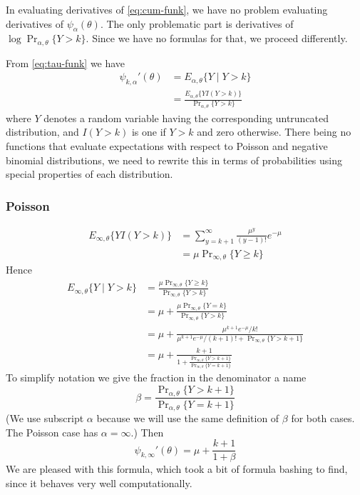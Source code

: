 \documentclass[11pt]{article}
\newcommand{\Prsub}[1]{\Pr\nolimits_{#1}}
\begin{document}
In evaluating derivatives of \eqref{eq:cum-funk}, we have no
problem evaluating derivatives of $\psi_\alpha(\theta)$.
The only problematic part is derivatives of
$\log \Prsub{\alpha, \theta}\{Y > k\}$.
Since we have no formulas for that, we proceed differently.

From \eqref{eq:tau-funk} we have
\begin{align*}
   \psi_{k, \alpha}'(\theta)
   & =
   E_{\alpha, \theta}\{ Y \mid Y > k \}
   \\
   & =
   \frac{E_{\alpha, \theta}\{ Y I(Y > k) \}}
   {\Prsub{\alpha, \theta}\{Y > k\}}
\end{align*}
where $Y$ denotes a random variable having the corresponding
untruncated distribution, and $I(Y > k)$ is one if $Y > k$ and zero otherwise.
There being no functions that evaluate expectations with respect
to Poisson and negative binomial distributions, we need to rewrite
this in terms of probabilities using special properties of each distribution.

\subsubsection{Poisson}

\begin{equation} \label{eq:trick-pois}
\begin{split}
   E_{\infty, \theta}\{ Y I(Y > k) \}
   & =
   \sum_{y = k + 1}^\infty \frac{\mu^y}{(y - 1) !} e^{- \mu}
   \\
   & =
   \mu \Prsub{\infty, \theta}\{Y \ge k\}
\end{split}
\end{equation}
Hence
\begin{align*}
   E_{\infty, \theta}\{ Y \mid Y > k \}
   & =
   \frac{\mu \Prsub{\infty, \theta}\{Y \ge k\}}
   {\Prsub{\infty, \theta}\{Y > k\}}
   \\
   & =
   \mu + \frac{\mu \Prsub{\infty, \theta}\{Y = k\}}
   {\Prsub{\infty, \theta}\{Y > k\}}
   \\
   & =
   \mu +
   \frac{\mu^{k + 1} e^{- \mu} / k !}
   {\mu^{k + 1} e^{- \mu} / (k + 1) ! + \Prsub{\infty, \theta}\{Y > k + 1 \}}
   \\
   & =
   \mu +
   \frac{k + 1}
   {1 + \frac{\Prsub{\infty, \theta}\{Y > k + 1 \}}
   {\Prsub{\infty, \theta}\{Y = k + 1 \}}}
\end{align*}
To simplify notation we give the fraction in the denominator a name
\begin{equation} \label{eq:beta}
   \beta = \frac{\Prsub{\alpha, \theta}\{Y > k + 1 \}}
   {\Prsub{\alpha, \theta}\{Y = k + 1 \}}
\end{equation}
(We use subscript $\alpha$ because we will use the same definition of
$\beta$ for both cases.  The Poisson case has $\alpha = \infty$.)
Then
\begin{equation} \label{eq:tau-comp-pois}
   \psi_{k, \infty}'(\theta) = \mu + \frac{k + 1}{1 + \beta}
\end{equation}
We are pleased with this formula, which took a bit of formula bashing
to find, since it behaves very well computationally.
\end{document}
